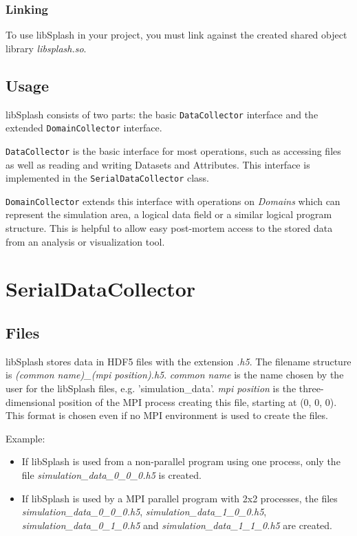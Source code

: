 \documentclass[a4paper,10pt,BCOR12mm]{report}
\begin{document}
\subsection{Linking}

To use libSplash in your project, you must link against the created shared object library
\emph{libsplash.so}.


\section{Usage}

libSplash consists of two parts: the basic \texttt{DataCollector} interface and the extended \texttt{DomainCollector} interface.

\texttt{DataCollector} is the basic interface for most operations, such as accessing files as well as reading and writing Datasets and Attributes.
This interface is implemented in the \texttt{SerialDataCollector} class.

\texttt{DomainCollector} extends this interface with operations on \emph{Domains} which can represent the simulation area,
a logical data field or a similar logical program structure. This is helpful to allow easy post-mortem access to the stored data from
an analysis or visualization tool.


\chapter{SerialDataCollector}

\section{Files}

libSplash stores data in HDF5 files with the extension \emph{.h5}.
The filename structure is \emph{(common name)\_(mpi position).h5}.
\emph{common name} is the name chosen by the user for the libSplash files, e.g.
'simulation\_data'.
\emph{mpi position} is the three-dimensional position of the MPI process creating this
file, starting at (0, 0, 0).
This format is chosen even if no MPI environment is used to create the files.

Example:
\begin{itemize}
	\item If libSplash is used from a non-parallel program using one process, only the file \emph{simulation\_data\_0\_0\_0.h5} is created.

	\item If libSplash is used by a MPI parallel program with 2x2 processes, the files
	\emph{simulation\_data\_0\_0\_0.h5}, \emph{simulation\_data\_1\_0\_0.h5},
	\emph{simulation\_data\_0\_1\_0.h5} and \emph{simulation\_data\_1\_1\_0.h5} are created.
\end{itemize}
\end{document}
